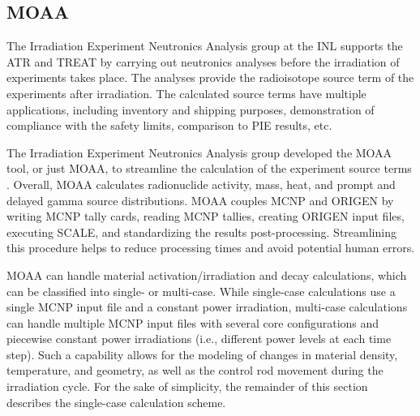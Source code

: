 \subsection{MOAA}
\label{sec:MOAA}

The Irradiation Experiment Neutronics Analysis group at the \gls*{INL} supports the \gls*{ATR} and \gls*{TREAT} by carrying out neutronics analyses before the irradiation of experiments takes place.
The analyses provide the radioisotope source term of the experiments after irradiation.
The calculated source terms have multiple applications, including inventory and shipping purposes, demonstration of compliance with the safety limits, comparison to \gls*{PIE} results, etc.

The Irradiation Experiment Neutronics Analysis group developed the MOAA tool, or just MOAA, to streamline the calculation of the experiment source terms \cite{fairhurst-agosta_development_2022}.
Overall, MOAA calculates radionuclide activity, mass, heat, and prompt and delayed gamma source distributions.
MOAA couples MCNP and ORIGEN by writing MCNP tally cards, reading MCNP tallies, creating ORIGEN input files, executing SCALE, and standardizing the results post-processing.
Streamlining this procedure helps to reduce processing times and avoid potential human errors.

MOAA can handle material activation/irradiation and decay calculations, which can be classified into single- or multi-case.
While single-case calculations use a single MCNP input file and a constant power irradiation, multi-case calculations can handle multiple MCNP input files with several core configurations and piecewise constant power irradiations (i.e., different power levels at each time step). %
Such a capability allows for the modeling of changes in material density, temperature, and geometry, as well as the control rod movement during the irradiation cycle.
For the sake of simplicity, the remainder of this section describes the single-case calculation scheme.

